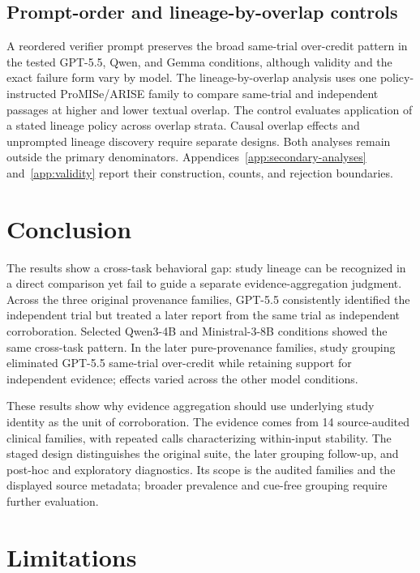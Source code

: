 \documentclass[11pt]{article}
\begin{document}
\subsection{Prompt-order and lineage-by-overlap controls}

A reordered verifier prompt preserves the broad same-trial over-credit pattern in the tested GPT-5.5, Qwen, and Gemma conditions, although validity and the exact failure form vary by model. The lineage-by-overlap analysis uses one policy-instructed ProMISe/ARISE family to compare same-trial and independent passages at higher and lower textual overlap. The control evaluates application of a stated lineage policy across overlap strata. Causal overlap effects and unprompted lineage discovery require separate designs. Both analyses remain outside the primary denominators. Appendices~\ref{app:secondary-analyses} and~\ref{app:validity} report their construction, counts, and rejection boundaries.


\section{Conclusion}

The results show a cross-task behavioral gap: study lineage can be recognized in a direct comparison yet fail to guide a separate evidence-aggregation judgment. Across the three original provenance families, GPT-5.5 consistently identified the independent trial but treated a later report from the same trial as independent corroboration. Selected Qwen3-4B and Ministral-3-8B conditions showed the same cross-task pattern. In the later pure-provenance families, study grouping eliminated GPT-5.5 same-trial over-credit while retaining support for independent evidence; effects varied across the other model conditions.

These results show why evidence aggregation should use underlying study identity as the unit of corroboration. The evidence comes from 14 source-audited clinical families, with repeated calls characterizing within-input stability. The staged design distinguishes the original suite, the later grouping follow-up, and post-hoc and exploratory diagnostics. Its scope is the audited families and the displayed source metadata; broader prevalence and cue-free grouping require further evaluation.

\section*{Limitations}
\end{document}
